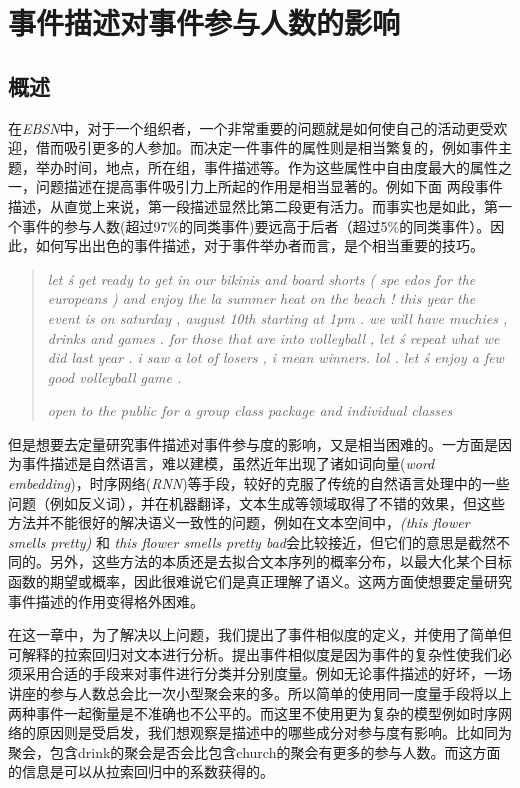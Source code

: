 \documentclass[12pt]{template}
\begin{document}
   
\section{事件描述对事件参与人数的影响} 
\subsection{概述}  
在\textit{EBSN}中，对于一个组织者，一个非常重要的问题就是如何使自己的活动更受欢迎，借而吸引更多的人参加。而决定一件事件的属性则是相当繁复的，例如事件主题，举办时间，地点，所在组，事件描述等。作为这些属性中自由度最大的属性之一，问题描述在提高事件吸引力上所起的作用是相当显著的。例如下面
两段事件描述，从直觉上来说，第一段描述显然比第二段更有活力。而事实也是如此，第一
个事件的参与人数(超过97\%的同类事件)要远高于后者（超过5\%的同类事件）。因此，如何写出出色的事件描述，对于事件举办者而言，是个相当重要的技巧。
 
\begin{quotation}
  \textit{let  \'s get ready to get in our bikinis and board shorts  (  spe
  edos for the europeans  )  and enjoy the la summer heat on the beach
  !  this year the event is on saturday  ,  august 10th starting at 
  1pm . we will have muchies  ,  drinks and games . for those that 
  are into volleyball  ,  let  \'s repeat what we did last year . 
  i saw a lot of losers  ,  i mean winners. lol . let  \'s enjoy 
  a few good volleyball game . \\ 
  }
    
  \textit{open to the public for a group class package and individual classes}
\end{quotation}

但是想要去定量研究事件描述对事件参与度的影响，又是相当困难的。一方面是因为事件描述是自然语言，难以建模，虽然近年出现了诸如词向量(\textit{word embedding})，时序网络(\textit{RNN})等手段，较好的克服了传统的自然语言处理中的一些问题（例如反义词），并在机器翻译，文本生成等领域取得了不错的效果，但这些方法并不能很好的解决语义一致性的问题，例如在文本空间中，\textit{(this flower smells pretty)} 和 \textit{this flower smells pretty bad}会比较接近，但它们的意思是截然不同的。另外，这些方法的本质还是去拟合文本序列的概率分布，以最大化某个目标函数的期望或概率，因此很难说它们是真正理解了语义。这两方面使想要定量研究事件描述的作用变得格外困难。

在这一章中，为了解决以上问题，我们提出了事件相似度的定义，并使用了简单但可解释的拉索回归对文本进行分析。提出事件相似度是因为事件的复杂性使我们必须采用合适的手段来对事件进行分类并分别度量。例如无论事件描述的好坏，一场讲座的参与人数总会比一次小型聚会来的多。所以简单的使用同一度量手段将以上两种事件一起衡量是不准确也不公平的。而这里不使用更为复杂的模型例如时序网络的原因则是受\cite{noauthor_predicting_nodate}启发，我们想观察是描述中的哪些成分对参与度有影响。比如同为聚会，包含drink的聚会是否会比包含church的聚会有更多的参与人数。而这方面的信息是可以从拉索回归中的系数获得的。
\end{document}
